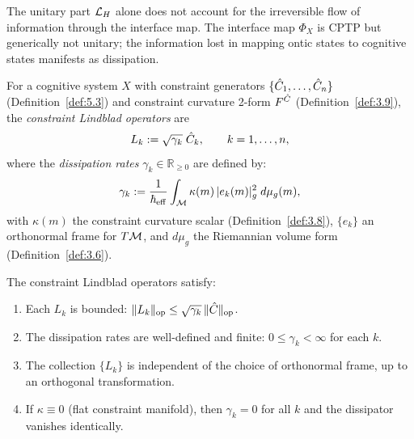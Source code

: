 The unitary part $\mathcal{L}_H$ alone does not account for the irreversible
flow of information through the interface map.  The interface map
$\Phi_X$ is CPTP but generically not unitary; the information lost
in mapping ontic states to cognitive states manifests as dissipation.

\begin{definition}
\label{def:7.2}
For a cognitive system $X$ with constraint generators
$\{\hat{C}_1, \ldots, \hat{C}_n\}$ (Definition~\ref{def:5.3}) and
constraint curvature 2-form $F^{\hat{C}}$ (Definition~\ref{def:3.9}),
the \emph{constraint Lindblad operators} are
\[
  L_k := \sqrt{\gamma_k}\;\hat{C}_k,
  \qquad k = 1, \ldots, n,
\]
where the \emph{dissipation rates}
$\gamma_k \in \mathbb{R}_{\geq 0}$ are defined by:
\[
  \gamma_k :=
  \frac{1}{\hbar_{\mathrm{eff}}}
  \int_{\mathcal{M}} \kappa(m)\,|e_k(m)|_g^2 \; d\mu_g(m),
\]
with $\kappa(m)$ the constraint curvature scalar
\textup{(}Definition~\textup{\ref{def:3.8})},
$\{e_k\}$ an orthonormal frame for $T\mathcal{M}$, and $d\mu_g$ the
Riemannian volume form \textup{(}Definition~\textup{\ref{def:3.6})}.
\end{definition}

\begin{lemma}
\label{lem:7.2}
The constraint Lindblad operators satisfy:
\begin{enumerate}
  \item[\textup{(i)}] Each $L_k$ is bounded:
    $\|L_k\|_{\mathrm{op}} \leq \sqrt{\gamma_k}\,
    \|\hat{C}\|_{\mathrm{op}}$.
  \item[\textup{(ii)}] The dissipation rates are well-defined and
    finite: $0 \leq \gamma_k < \infty$ for each $k$.
  \item[\textup{(iii)}] The collection $\{L_k\}$ is independent of
    the choice of orthonormal frame, up to an orthogonal transformation.
  \item[\textup{(iv)}] If $\kappa \equiv 0$ \textup{(}flat constraint
    manifold\textup{)}, then $\gamma_k = 0$ for all $k$ and the
    dissipator vanishes identically.
\end{enumerate}
\end{lemma}

